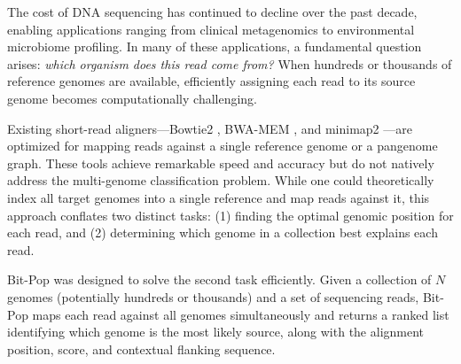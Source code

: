 \documentclass[utf8]{article}
\begin{document}
The cost of DNA sequencing has continued to decline over the past decade, enabling applications ranging from clinical metagenomics to environmental microbiome profiling. In many of these applications, a fundamental question arises: \textit{which organism does this read come from?} When hundreds or thousands of reference genomes are available, efficiently assigning each read to its source genome becomes computationally challenging.

Existing short-read aligners---Bowtie2 \citep{langmead2012}, BWA-MEM \citep{li2013}, and minimap2 \citep{li2018}---are optimized for mapping reads against a single reference genome or a pangenome graph. These tools achieve remarkable speed and accuracy but do not natively address the multi-genome classification problem. While one could theoretically index all target genomes into a single reference and map reads against it, this approach conflates two distinct tasks: (1) finding the optimal genomic position for each read, and (2) determining which genome in a collection best explains each read.

Bit-Pop was designed to solve the second task efficiently. Given a collection of $N$ genomes (potentially hundreds or thousands) and a set of sequencing reads, Bit-Pop maps each read against all genomes simultaneously and returns a ranked list identifying which genome is the most likely source, along with the alignment position, score, and contextual flanking sequence.
\end{document}
